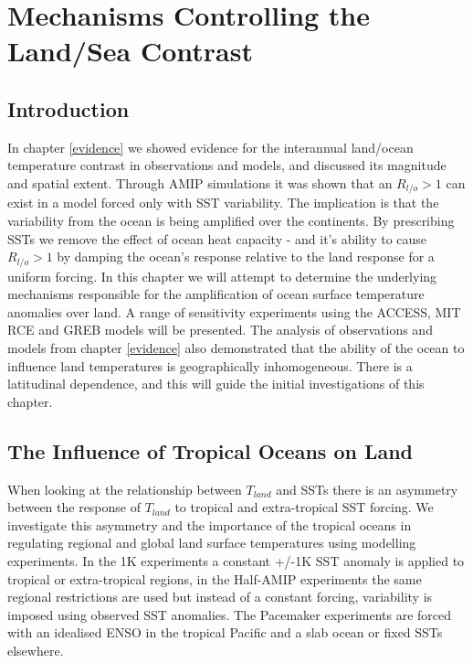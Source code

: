 \chapter{Mechanisms Controlling the Land/Sea Contrast} 

\tableofcontents %

\label{mechanisms} 


\section{Introduction}
In chapter \ref{evidence} we showed evidence for the interannual land/ocean 
temperature contrast in observations and models, and discussed its magnitude and 
spatial extent. Through AMIP simulations it was shown that an $R_{l/o}>1$ can 
exist in a model forced only with SST variability. The implication is that the 
variability from the ocean is being amplified over the continents. By 
prescribing SSTs we remove the effect of ocean heat capacity - and it's ability 
to cause $R_{l/o}>1$ by damping the ocean's response relative to the land 
response for a uniform forcing. In this chapter we will attempt to determine the 
underlying mechanisms responsible for the amplification of ocean surface 
temperature anomalies over land. A range of sensitivity experiments using the 
ACCESS, MIT RCE and GREB models will be presented.  The analysis of observations 
and models from chapter \ref{evidence} also demonstrated that the ability of the 
ocean to influence land temperatures is geographically inhomogeneous. There is a  
latitudinal dependence, and this will guide the initial investigations of this 
chapter.


\section{The Influence of Tropical Oceans on Land}

When looking at the relationship between $T_{land}$ and SSTs there is an 
asymmetry between the response of $T_{land}$ to tropical and extra-tropical SST 
forcing. We investigate this asymmetry and the importance of the tropical oceans 
in regulating regional and global land surface temperatures using modelling 
experiments. In the 1K experiments a constant +/-1K SST anomaly is applied to 
tropical or extra-tropical regions, in the Half-AMIP experiments the same 
regional restrictions are used but instead of a constant forcing, variability is 
imposed using observed SST anomalies. The Pacemaker experiments are forced with 
an idealised ENSO in the tropical Pacific and a slab ocean or fixed SSTs 
elsewhere.

